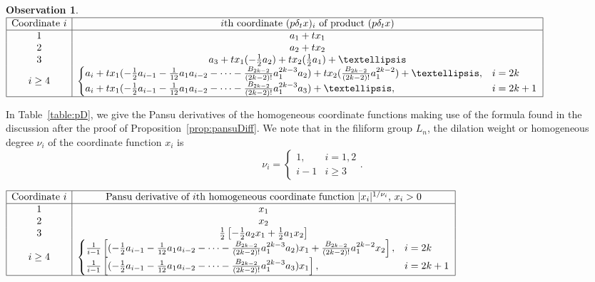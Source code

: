 \documentclass{article}
\theoremstyle{definition}
\newtheorem{observation}[theorem]{Observation}
\begin{document}
\begin{observation}
\renewcommand{\arraystretch}{1.2}
\begin{table}[H]
$
\begin{array}{|c|c|c|}
\hline
\text{Coordinate $i$} & \text{$i$th coordinate $(p\delta_tx)_i$ of product $(p\delta_tx)$}\\
\hline
1 & a_1 + tx_1 \\
2 & a_2 + tx_2 \\
3 & a_3 + tx_1(-\frac12a_2) + tx_2(\frac12 a_1) + \dots\\
i\geq 4 & 
\begin{cases}
a_i + tx_1(-\frac12a_{i-1} - \frac1{12}a_1 a_{i-2} - \cdots - \frac{B_{2k-2}}{(2k-2)!}a_1^{2k-3}a_2) + tx_2(\frac{B_{2k-2}}{(2k-2)!}a_1^{2k-2}) + \dots, & i = 2k\\
a_i + tx_1(-\frac12a_{i-1} - \frac1{12}a_1 a_{i-2} - \cdots - \frac{B_{2k-2}}{(2k-2)!}a_1^{2k-3}a_3) + \dots, & i = 2k+1
\end{cases}\\
\hline
\end{array}$
\caption{Multiplication in $L_n$.}
\label{table:coords}
\end{table}


In Table~\ref{table:pD}, we give the Pansu derivatives of the homogeneous coordinate functions making use of the formula found in the discussion after the proof of Proposition~\ref{prop:pansuDiff}. We note that in the filiform group $L_n$, the dilation weight or homogeneous degree $\nu_i$ of the coordinate function $x_i$ is
\[
\nu_i = \begin{cases}
1, & i = 1,2\\
i-1 & i \geq 3
\end{cases}.
\]


\begin{table}[ht]
$
\begin{array}{|c|c|}
\hline
\text{Coordinate $i$} & \text{Pansu derivative of $i$th homogeneous coordinate function $|x_i|^{1/\nu_i}$, $x_i>0$}\\
\hline
1 &  x_1\\
2 & x_2\\
3  & \frac{1}{2}\left[-\frac12a_2x_1 + \frac12a_1x_2\right]\\
i\geq 4 & 
\begin{cases}
\frac{1}{i-1}\left[(-\frac12a_{i-1} - \frac1{12}a_1 a_{i-2} - \cdots - \frac{B_{2k-2}}{(2k-2)!}a_1^{2k-3}a_2)x_1 + \frac{B_{2k-2}}{(2k-2)!}a_1^{2k-2}x_2\right], & i = 2k\\
\frac{1}{i-1}\left[(-\frac12a_{i-1} - \frac1{12}a_1 a_{i-2} - \cdots - \frac{B_{2k-2}}{(2k-2)!}a_1^{2k-3}a_3)x_1\right], & i = 2k+1\\
\end{cases}\\
\hline
\end{array}$
\caption{Pansu derivatives of homogeneous coordinate functions.}
\label{table:pD}
\end{table}
\end{observation}
\end{document}
